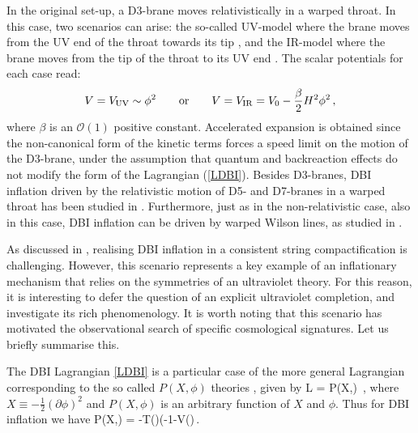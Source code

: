 In the original set-up, a D3-brane moves relativistically in a warped throat. In this case, two scenarios can arise: the so-called UV-model where the brane moves from the UV end of the throat towards its tip \cite{Alishahiha:2004eh,Silverstein:2003hf}, and the IR-model where the brane moves from the tip of the throat to its UV end \cite{Chen:2004gc,Chen:2005ad}. The scalar potentials for each case read:
\begin{equation}
V = V_{\rm UV} \sim \phi^2\qquad\text{or}\qquad V = V_{\rm IR} = V_0-\frac{\beta}{2} H^2\phi^2\,,
\end{equation}
where $\beta$ is an $\mathcal{O}(1)$ positive constant. Accelerated expansion is obtained since the non-canonical form of the kinetic terms forces a speed limit on the motion of the D3-brane, under the assumption that quantum and backreaction effects do not modify the form of the Lagrangian (\ref{LDBI}). 
Besides D3-branes, DBI inflation driven by the relativistic motion of  D5- and D7-branes  in a warped throat has been studied in \cite{Kobayashi:2007hm}. Furthermore, just as in the non-relativistic case, also in this case, DBI inflation can be driven by warped Wilson lines, as studied in \cite{Avgoustidis:2008zu,Kooner:2015rza}.   

As discussed in \cite{Chen:2008hz,Baumann:2022mni},  realising DBI inflation in a consistent  string compactification is challenging. However, this scenario represents a key  example of an inflationary mechanism that relies on the symmetries of an ultraviolet theory. For this reason, it is interesting to defer the question of an explicit ultraviolet completion, and  investigate its rich phenomenology. It is worth noting that this scenario has motivated the observational search of specific cosmological signatures. Let us briefly summarise this. 

The DBI Lagrangian \eqref{LDBI} is a particular case of the more general Lagrangian corresponding to the so called $P(X, \phi)$ theories \cite{Armendariz-Picon:1999hyi,Garriga:1999vw,Chen:2006nt}, given by
\be
{\mathcal L} = P(X,\phi) \,,
\ee
where $X\equiv -\frac12(\partial\phi)^2$ and $P(X,\phi)$ is an arbitrary function of $X$ and $\phi$. Thus for DBI inflation we have 
\be
P(X,\phi) = -T(\phi)\left(-1\rp -V(\phi)\,.
\ee

